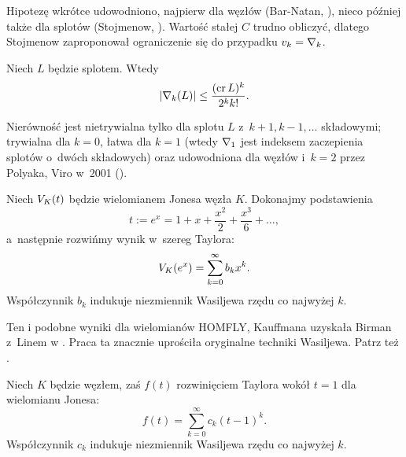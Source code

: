Hipotezę wkrótce udowodniono, najpierw dla węzłów (Bar-Natan, \cite{barnatan95}), nieco później także dla splotów (Stojmenow, \cite{stoimenow_01}).
Wartość stałej $C$ trudno obliczyć, dlatego Stojmenow zaproponował \cite[problem 1.17]{ohtsuki02} ograniczenie się do przypadku $v_k = \nabla_k$.

\begin{conjecture}
    Niech $L$ będzie splotem.
    Wtedy
    \begin{equation}
        |\nabla_k(L)| \le \frac{(\operatorname{cr} L)^k}{2^kk!}.
    \end{equation}
\end{conjecture}

Nierówność jest nietrywialna tylko dla splotu $L$ z~$k+1, k-1, \ldots$ składowymi; trywialna dla $k = 0$, łatwa dla $k=1$ (wtedy $\nabla_1$ jest indeksem zaczepienia splotów o~dwóch składowych) oraz udowodniona dla węzłów i~$k=2$ przez Polyaka, Viro w~2001 (\cite{polyak01}).

\begin{example}
    Niech $V_K(t)$ będzie wielomianem Jonesa węzła $K$.
    Dokonajmy podstawienia
    \begin{equation}
        t := e^x = 1 + x + \frac{x^2}{2} + \frac{x^3}{6} + \ldots,
    \end{equation}
    a~następnie rozwińmy wynik w~szereg Taylora:
    \begin{equation}
        V_K(e^x) = \sum_{k = 0}^\infty b_k x^k.
    \end{equation}
    Współczynnik $b_{k}$ indukuje niezmiennik Wasiljewa rzędu co najwyżej $k$.
\end{example}

Ten i podobne wyniki dla wielomianów HOMFLY, Kauffmana uzyskała Birman z~Linem w \cite{birman93}.
Praca ta znacznie uprościła oryginalne techniki Wasiljewa.
Patrz też \cite[s. 56]{chmutov12}.

\begin{example}
    Niech $K$ będzie węzłem, zaś $f(t)$ rozwinięciem Taylora wokół $t = 1$ dla wielomianu Jonesa:
    \begin{equation}
        f(t) = \sum_{k = 0}^\infty c_k (t-1)^k.
    \end{equation}
    Współczynnik $c_{k}$ indukuje niezmiennik Wasiljewa rzędu co najwyżej $k$.
\end{example}

